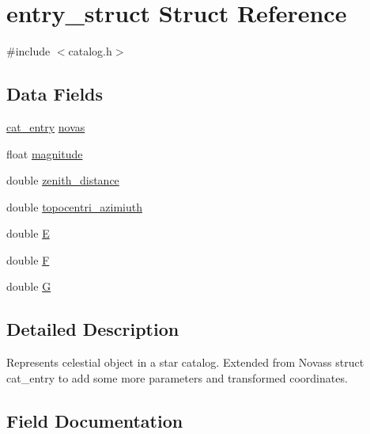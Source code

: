 \hypertarget{structentry__struct}{}\section{entry\+\_\+struct Struct Reference}
\label{structentry__struct}


{\ttfamily \#include $<$catalog.\+h$>$}

\subsection*{Data Fields}
\begin{DoxyCompactItemize}
\item 
\mbox{\hyperlink{novas_8h_a262daaa71cede05205cfaa727313c1f3}{cat\+\_\+entry}} \mbox{\hyperlink{structentry__struct_ac03920d0c64ed555ac71b25d04edd35e}{novas}}
\item 
float \mbox{\hyperlink{structentry__struct_a90598eb01c338f4bbab41ad4aab9fcc0}{magnitude}}
\item 
double \mbox{\hyperlink{structentry__struct_a3c2f9054e85abef611e387ff641fe831}{zenith\+\_\+distance}}
\item 
double \mbox{\hyperlink{structentry__struct_ab14bfd72ae3d4f1e24e268c4383d4eb9}{topocentri\+\_\+azimiuth}}
\item 
double \mbox{\hyperlink{structentry__struct_a1eb62b8cb1f5e5f571d51179718e7d4c}{E}}
\item 
double \mbox{\hyperlink{structentry__struct_ae3520ebb3ff8d6feab3e6afb47ed4040}{F}}
\item 
double \mbox{\hyperlink{structentry__struct_a67783a2c4f670ee5a9dadcf428324d32}{G}}
\end{DoxyCompactItemize}


\subsection{Detailed Description}
Represents celestial object in a star catalog. Extended from Novas\textquotesingle{}s struct cat\+\_\+entry to add some more parameters and transformed coordinates. 

\subsection{Field Documentation}
\mbox{\label{structentry__struct_a1eb62b8cb1f5e5f571d51179718e7d4c}} 
